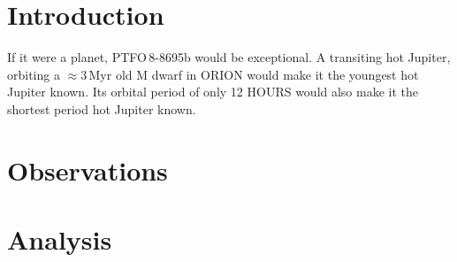 \documentclass[12pt,twocolumn,tighten]{aastex62}
\begin{document}
\keywords{}


\section{Introduction}
If it were a planet, PTFO$\,$8-8695b would be exceptional.
A transiting hot Jupiter, orbiting a $\approx$3$\,$Myr old M dwarf
in ORION would make it the youngest hot Jupiter known.
Its orbital period of only 12 HOURS would also make it the shortest
period hot Jupiter known.


\section{Observations}
\label{sec:observations}



\section{Analysis}
\label{sec:analysis}
\end{document}
